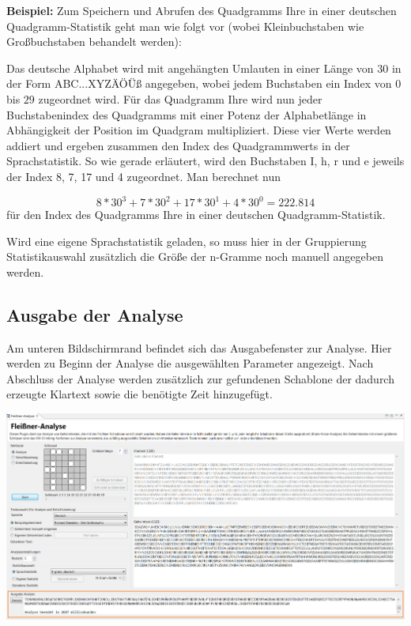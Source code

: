 \documentclass[fontsize=12pt, DIV=15, parskip=half-]{scrartcl}
\theoremstyle{break}
\begin{document}
\begin{enumerate}[label=(\alph*), leftmargin=*]
\textbf{Beispiel:}
Zum Speichern und Abrufen des Quadgramms \glqq Ihre\grqq{} in einer deutschen Quadgramm-Statistik geht man wie folgt vor (wobei Kleinbuchstaben wie Großbuchstaben behandelt werden):

Das deutsche Alphabet wird mit angehängten Umlauten in einer Länge von 30 in der Form \glqq ABC...XYZÄÖÜß\grqq{} angegeben, wobei jedem Buchstaben ein Index von $0$ bis $29$ zugeordnet wird. Für das Quadgramm \glqq Ihre\grqq{} wird nun jeder Buchstabenindex des Quadgramms mit einer Potenz der Alphabetlänge in Abhängigkeit der Position im Quadgram multipliziert. Diese vier Werte werden addiert und ergeben zusammen den Index des Quadgrammwerts in der Sprachstatistik. So wie gerade erläutert, wird den Buchstaben I, h, r und e jeweils der Index 8, 7, 17 und 4 zugeordnet. Man berechnet nun

\[ 
8*30^3 + 7*30^2 + 17* 30^1+4*30^0 = 222.814
\]
für den Index des Quadgramms \glqq Ihre\grqq{} in einer deutschen Quadgramm-Statistik.

Wird eine eigene Sprachstatistik geladen, so muss hier in der Gruppierung \glqq Statistikauswahl\grqq{} zusätzlich die Größe der n-Gramme noch manuell angegeben werden.
\end{enumerate}
\newpage

\subsection{Ausgabe der Analyse}

Am unteren Bildschirmrand befindet sich das Ausgabefenster zur Analyse.
Hier werden zu Beginn der Analyse die ausgewählten Parameter angezeigt. Nach Abschluss der Analyse werden zusätzlich zur gefundenen Schablone der dadurch erzeugte Klartext sowie die benötigte Zeit hinzugefügt.

\includegraphics[scale=0.45]{FleissnerAusgabeAnalyse.png}
\end{document}
